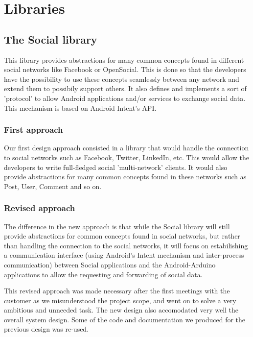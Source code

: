 \newpage

\section{Libraries}

\subsection{The Social library}
This library provides abstractions for many common concepts found in different
social networks like Facebook or OpenSocial. This is done so that the developers have the possibility
to use these concepts seamlessly between any network and extend them to possibily support others.
It also defines and implements a sort of 'protocol' to allow Android applications and/or services
to exchange social data. This mechanism is based on Android Intent's API.

\subsubsection{First approach}
Our first design approach consisted in a library that would handle the connection to social networks
such as Facebook, Twitter, LinkedIn, etc. This would  allow the developers to write full-fledged
social 'multi-network' clients. It would also provide abstractions for many common concepts
found in these networks such as Post, User, Comment and so on.

\subsubsection{Revised approach}
The difference in the new approach is that while the Social library will still provide
abstractions for common concepts found in social networks, but rather than handling
the connection to the social networks, it will focus on estabilishing a communication interface (using Android's Intent mechanism and inter-process communication) between Social applications and the Android-Arduino applications to allow the requesting and forwarding of social data.

This revised approach was made necessary after the first meetings with the customer as we misunderstood the project scope, 
and went on to solve a very ambitious and unneeded task. The new design also accomodated very well the overall system design. 
Some of the code and documentation we produced for the previous design was re-used.

